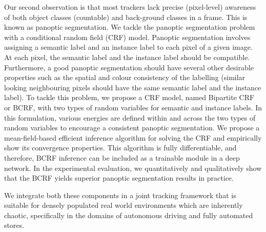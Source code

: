 Our second observation is that most trackers lack precise (pixel-level) awareness of both object classes (countable) and back-ground classes in a frame. This is known as panoptic segmentation. We tackle the panoptic segmentation problem with a conditional random field (CRF) model. Panoptic segmentation involves assigning a semantic label and an instance label to each pixel of a given image. At each pixel, the semantic label and the instance label should be compatible. Furthermore, a good panoptic segmentation should have several other desirable properties such as the spatial and colour consistency of the labelling (similar looking neighbouring pixels should have the same semantic label and the instance label). To tackle this problem, we propose a CRF model, named Bipartite CRF or BCRF, with two types of random variables for semantic and instance labels. In this formulation, various energies are defined within and across the two types of random variables to encourage a consistent panoptic segmentation. We propose a mean-field-based efficient inference algorithm for solving the CRF and empirically show its convergence properties. This algorithm is fully differentiable, and therefore, BCRF inference can be included as a trainable module in a deep network. In the experimental evaluation, we quantitatively and qualitatively show that the BCRF yields superior panoptic segmentation results in practice.

We integrate both these components in a joint tracking framework that is suitable for densely populated real world environments which are inherently chaotic, specifically in the domains of autonomous driving and fully automated stores.

